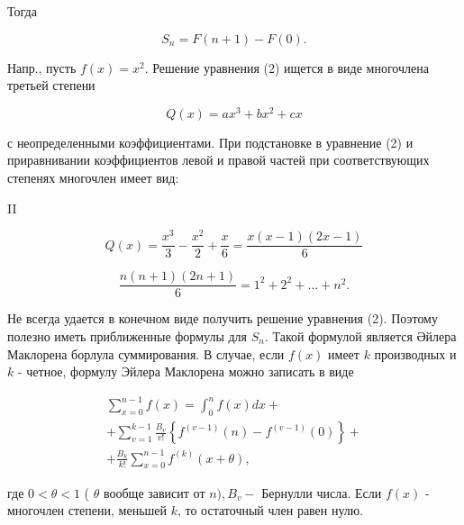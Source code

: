 \documentclass[10pt]{article}
\begin{document}
Тогда



\[

S_{n}=F(n+1)-F(0) .

\]



Напр., пусть $f(x)=x^{2}$. Решение уравнения (2) ищется в виде многочлена третьей степени



\[

Q(x)=a x^{3}+b x^{2}+c x

\]



с неопределенными коэффициентами. При подстановке в уравнение (2) и приравнивании коэффициентов левой и правой частей при соответствующих степенях многочлен имеет вид:



II



\[

Q(x)=\frac{x^{3}}{3}-\frac{x^{2}}{2}+\frac{x}{6}=\frac{x(x-1)(2 x-1)}{6}

\]



\[

\frac{n(n+1)(2 n+1)}{6}=1^{2}+2^{2}+\ldots+n^{2} .

\]



Не всегда удается в конечном виде получить решение уравнения (2). Поэтому полезно иметь приближенные формулы для $S_{n}$. Такой формулой является Әйлера Маклорена борлула суммирования. В случае, если $f(x)$ имеет $k$ производных и $k$ - четное, формулу Эйлера Маклорена можно записать в виде



\[

\begin{gathered}

\sum_{x=0}^{n-1} f(x)=\int_{0}^{n} f(x) d x+ \\

+\sum_{v=1}^{k-1} \frac{B_{v}}{v !}\left\{f^{(v-1)}(n)-f^{(v-1)}(0)\right\}+ \\

+\frac{B_{k}}{k !} \sum_{x=0}^{n-1} f^{(k)}(x+\theta),

\end{gathered}

\]



где $0<\theta<1$ ( $\theta$ вообще зависит от $n), B_{v}-$ Бернулли числа. Если $f(x)$ - многочлен степени, меньшей $k$, то остаточный член равен нулю.
\end{document}
